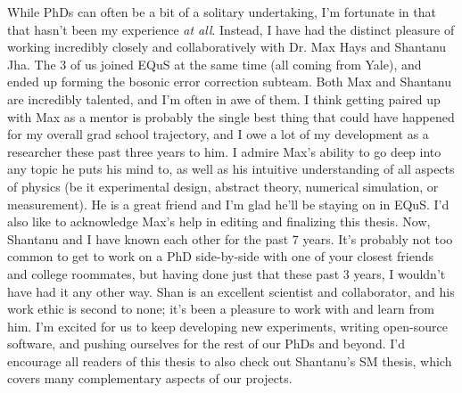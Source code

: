 \begin{onehalfspacing}
While PhDs can often be a bit of a solitary undertaking, I'm fortunate in that that hasn't been my experience \textit{at all}. Instead, I have had the distinct pleasure of working incredibly closely and collaboratively with Dr. Max Hays and Shantanu Jha. The 3 of us joined EQuS at the same time (all coming from Yale), and ended up forming the bosonic error correction subteam. Both Max and Shantanu are incredibly talented, and I'm often in awe of them. I think getting paired up with Max as a mentor is probably the single best thing that could have happened for my overall grad school trajectory, and I owe a lot of my development as a researcher these past three years to him. I admire Max's ability to go deep into any topic he puts his mind to, as well as his intuitive understanding of all aspects of physics (be it experimental design, abstract theory, numerical simulation, or measurement). He is a great friend and I'm glad he'll be staying on in EQuS. I'd also like to acknowledge Max's help in editing and finalizing this thesis. Now, Shantanu and I have known each other for the past 7 years. It's probably not too common to get to work on a PhD side-by-side with one of your closest friends and college roommates, but having done just that these past 3 years, I wouldn't have had it any other way. Shan is an excellent scientist and collaborator, and his work ethic is second to none; it's been a pleasure to work with and learn from him. I'm excited for us to keep developing new experiments, writing open-source software, and pushing ourselves for the rest of our PhDs and beyond. I'd encourage all readers of this thesis to also check out Shantanu's SM thesis, which covers many complementary aspects of our projects. 


\end{onehalfspacing}
